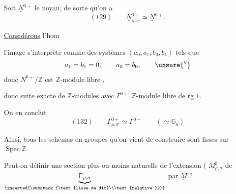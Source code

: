 Soit $\underline N^{0+}$ le noyau, de sorte qu'on a
\[
(129)\qquad\underline N_{\rho,\sigma}^{0+}\simeq\underline N^{0+}.
\]

\uline{Considérons} l'hom

l'image  s'interprète comme  des systèmes $(a_0,a_1,b_0,b_1)$ tels que 
\[
a_1=b_1=0,\qquad a_0=b_0,\qquad\unsure{''}
\]
donc  $N^{0+}/\mathbb Z$ est  $\mathbb Z$-module libre ,


donc  suite exacte de $\mathbb Z$-modules
avec $\Gamma^{0+}$ $\mathbb Z$-module libre de rg $1$.

On en conclut
\[
(132)\qquad\Gamma_{\rho,\sigma}^{0+}\simeq\underline\Gamma^{0+}
\qquad(\simeq\mathbb G_a)
\]

 Ainsi, tous les schémas en groupes qu'on vient de construire sont lisses sur $\operatorname{Spec}\mathbb Z$.

Peut-on définir une section plus-ou-moins naturelle de l'extension
(
$M_{\rho,\sigma}^{\sharp}$ de
$\underbrace{\Gamma_{\rho,\sigma}}_{\inserted{\substack{\text{lisse de dim}\\\text{relative }2}}}$
par $\underline M$ ?


